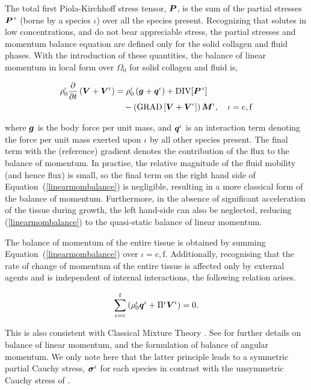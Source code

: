 The total first Piola-Kirchhoff stress tensor, $\mbox{\boldmath$ P$}$, is the sum of
the partial stresses $\mbox{\boldmath$ P$}^{\,\iota}$ (borne by a species $\iota$) over all
the species present. Recognizing that solutes in low concentrations,
and do not bear 
  appreciable stress, the partial stresses and momentum balance
  equation are defined only for the solid collagen and fluid
  phases. With the introduction 
  of these quantities, the 
balance of linear momentum in local form over $\Omega_0$ for solid
collagen and fluid is,

\begin{equation}
\begin{split}
\rho_0^\iota\frac{\partial}{\partial t}\left(\mbox{\boldmath$ V$}+\mbox{\boldmath$ V$}^\iota\right) &
=\rho^\iota_0\left(\mbox{\boldmath$ g$}+\mbox{\boldmath$ q$}^\iota\right) +
\mathrm{\small{DIV}}[\mbox{\boldmath$ P$}^{\,\iota}]\\ 
& \quad -\left(\mathrm{\small{GRAD}}\left[\mbox{\boldmath$ V$}+
  \mbox{\boldmath$ V$}^\iota\right]\right)\mbox{\boldmath$ M$}^\iota, \quad \iota = \mathrm{c,f}
\label{linearmombalance}
\end{split}
\end{equation} 

\noindent where $\mbox{\boldmath$ g$}$ is the body force per unit mass, and $\mbox{\boldmath$ q$}^\iota$
is an interaction term denoting the force per unit mass exerted upon
$\iota$ by all other species present. The final term with the
(reference) gradient denotes the contribution of the flux to the
balance of momentum. In practise, the relative magnitude of the fluid
mobility (and hence flux) is small, so the final term on the right
hand side of Equation~(\ref{linearmombalance}) is negligible,
resulting in a more classical form of the balance of
momentum. Furthermore, in the absence of significant acceleration of
the tissue during growth, the left hand-side can also be neglected,
reducing (\ref{linearmombalance}) to the quasi-static balance of
linear momentum.

The balance of momentum of the entire tissue is obtained by summing
Equation~(\ref{linearmombalance}) over $\iota = \mathrm{c,f}$. Additionally,
recognising that the rate of change of momentum of the entire tissue
is affected only by external agents and is independent of internal
interactions, the following relation arises.

\begin{equation}
\sum\limits_{\iota =
  \mathrm{c}}^\mathrm{f}\left(\rho^\iota_0\mbox{\boldmath$ q$}^\iota+\Pi^\iota
\mbox{\boldmath$ V$}^\iota 
\right)= 0. \label{qrelation}
\end{equation}

\noindent This is also consistent with Classical Mixture Theory
\citep{TruesdellNoll:65}. See \citet{growthpaper} for further
details on balance of linear momentum, and the formulation of
balance of angular momentum. We only note here that the latter
principle leads to a symmetric partial Cauchy stress,
$\mbox{\boldmath$\sigma$}^\iota$ for each species in contrast with the unsymmetric
Cauchy stress of \cite{EpsteinMaugin:2000}.

